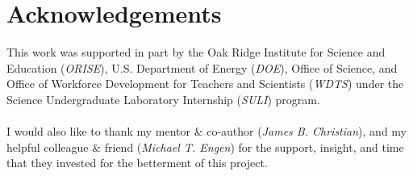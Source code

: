 \documentclass[twoside,twocolumn]{article}
\begin{document}
\section*{Acknowledgements}
This work was supported in part by the Oak Ridge Institute for Science and Education (\textit{ORISE}), U.S. Department of Energy (\textit{DOE}), Office of Science, and Office of Workforce Development for Teachers and Scientists (\textit{WDTS}) under the Science Undergraduate Laboratory Internship (\textit{SULI}) program.\\
\\
I would also like to thank my mentor \& co-author (\textit{James B. Christian}), and my helpful colleague \& friend (\textit{Michael T. Engen}) for the support, insight, and time that they invested for the betterment of this project.




\end{document}
